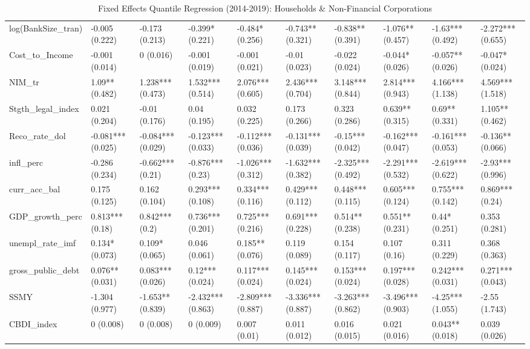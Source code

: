 \begin{table}[H]
\begin{subtable}[c]{\textwidth}
{\begin{tabular}{llllllllll}
  log(BankSize\_tran) & -0.005 (0.222) & -0.173 (0.213) & -0.399* (0.221) & -0.484* (0.256) & -0.743** (0.321) & -0.838** (0.391) & -1.076** (0.457) & -1.63*** (0.492) & -2.272*** (0.655) \\ 
  Cost\_to\_Income & -0.001 (0.014) & 0 (0.016) & -0.001 (0.019) & -0.001 (0.021) & -0.01 (0.023) & -0.022 (0.024) & -0.044* (0.026) & -0.057** (0.026) & -0.047* (0.024) \\ 
  NIM\_tr & 1.09** (0.482) & 1.238*** (0.473) & 1.532*** (0.514) & 2.076*** (0.605) & 2.436*** (0.704) & 3.148*** (0.844) & 2.814*** (0.943) & 4.166*** (1.138) & 4.569*** (1.518) \\ 
  Stgth\_legal\_index & 0.021 (0.204) & -0.01 (0.176) & 0.04 (0.195) & 0.032 (0.225) & 0.173 (0.266) & 0.323 (0.286) & 0.639** (0.315) & 0.69** (0.331) & 1.105** (0.462) \\ 
  Reco\_rate\_dol & -0.081*** (0.025) & -0.084*** (0.029) & -0.123*** (0.033) & -0.112*** (0.036) & -0.131*** (0.039) & -0.15*** (0.042) & -0.162*** (0.047) & -0.161*** (0.053) & -0.136** (0.066) \\ 
  infl\_perc & -0.286 (0.234) & -0.662*** (0.21) & -0.876*** (0.23) & -1.026*** (0.312) & -1.632*** (0.382) & -2.325*** (0.492) & -2.291*** (0.532) & -2.619*** (0.622) & -2.93*** (0.996) \\ 
  curr\_acc\_bal & 0.175 (0.125) & 0.162 (0.104) & 0.293*** (0.108) & 0.334*** (0.116) & 0.429*** (0.112) & 0.448*** (0.115) & 0.605*** (0.124) & 0.755*** (0.142) & 0.869*** (0.24) \\ 
  GDP\_growth\_perc & 0.813*** (0.18) & 0.842*** (0.2) & 0.736*** (0.201) & 0.725*** (0.216) & 0.691*** (0.228) & 0.514** (0.238) & 0.551** (0.231) & 0.44* (0.251) & 0.353 (0.281) \\ 
  unempl\_rate\_imf & 0.134* (0.073) & 0.109* (0.065) & 0.046 (0.061) & 0.185** (0.076) & 0.119 (0.089) & 0.154 (0.117) & 0.107 (0.16) & 0.311 (0.229) & 0.368 (0.363) \\ 
  gross\_public\_debt & 0.076** (0.031) & 0.083*** (0.026) & 0.12*** (0.024) & 0.117*** (0.024) & 0.145*** (0.024) & 0.153*** (0.024) & 0.197*** (0.028) & 0.242*** (0.031) & 0.271*** (0.043) \\ 
  SSMY & -1.304 (0.977) & -1.653** (0.839) & -2.432*** (0.863) & -2.809*** (0.887) & -3.336*** (0.887) & -3.263*** (0.862) & -3.496*** (0.903) & -4.25*** (1.055) & -2.55 (1.743) \\ 
  CBDI\_index & 0 (0.008) & 0 (0.008) & 0 (0.009) & 0.007 (0.01) & 0.011 (0.012) & 0.016 (0.015) & 0.021 (0.016) & 0.043** (0.018) & 0.039 (0.026) \\ 
   \bottomrule
\end{tabular}}
\end{subtable}

\caption{Fixed Effects Quantile Regression (2014-2019): Households \& Non-Financial Corporations} 
\label{qrfe_npl_hh.nfi}
\end{table}
